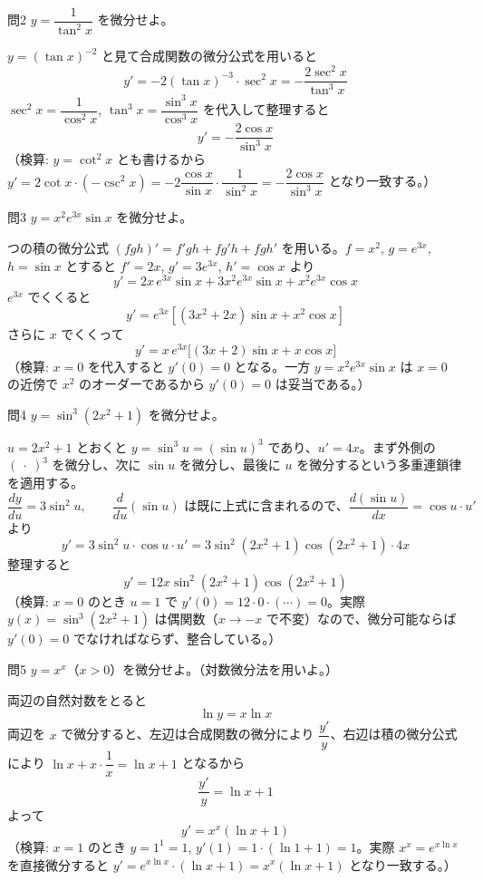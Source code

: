 \documentclass[a4paper,11pt]{article}
\begin{document}
\clearpage
\begin{mondaiboxS}{問2}
$y = \dfrac{1}{\tan^{2} x}$ を微分せよ。
\end{mondaiboxS}
\kaitou
$y = (\tan x)^{-2}$ と見て合成関数の微分公式を用いると
\[
y' = -2(\tan x)^{-3}\cdot \sec^{2}x
= -\frac{2\sec^{2}x}{\tan^{3}x}
\]
$\sec^{2}x = \dfrac{1}{\cos^{2}x}$, $\tan^{3}x = \dfrac{\sin^{3}x}{\cos^{3}x}$ を代入して整理すると
\[
\boxed{\; y' = -\dfrac{2\cos x}{\sin^{3} x} \;}
\]
（検算: $y=\cot^{2}x$ とも書けるから $y' = 2\cot x\cdot(-\csc^{2}x) = -2\dfrac{\cos x}{\sin x}\cdot\dfrac{1}{\sin^{2}x} = -\dfrac{2\cos x}{\sin^{3}x}$ となり一致する。）

\clearpage
\begin{mondaiboxS}{問3}
$y = x^{2}e^{3x}\sin x$ を微分せよ。
\end{mondaiboxS}
 つの積の微分公式 $(fgh)' = f'gh + fg'h + fgh'$ を用いる。$f=x^{2}$, $g=e^{3x}$, $h=\sin x$ とすると $f'=2x$, $g'=3e^{3x}$, $h'=\cos x$ より
\[
y' = 2x\,e^{3x}\sin x + 3x^{2}e^{3x}\sin x + x^{2}e^{3x}\cos x
\]
$e^{3x}$ でくくると
\[
y' = e^{3x}\left[(3x^{2}+2x)\sin x + x^{2}\cos x\right]
\]
さらに $x$ でくくって
\[
\boxed{\; y' = x\,e^{3x}\bigl[(3x+2)\sin x + x\cos x\bigr] \;}
\]
（検算: $x=0$ を代入すると $y'(0) = 0$ となる。一方 $y = x^{2}e^{3x}\sin x$ は $x=0$ の近傍で $x^{2}$ のオーダーであるから $y'(0)=0$ は妥当である。）

\clearpage
\begin{mondaiboxS}{問4}
$y = \sin^{3}\!\left(2x^{2}+1\right)$ を微分せよ。
\end{mondaiboxS}
\kaitou
$u = 2x^{2}+1$ とおくと $y = \sin^{3}u = (\sin u)^{3}$ であり、$u' = 4x$。まず外側の $(\ \cdot\ )^{3}$ を微分し、次に $\sin u$ を微分し、最後に $u$ を微分するという多重連鎖律を適用する。
\[
\frac{dy}{du} = 3\sin^{2}u, \qquad \frac{d}{du}(\sin u) \text{ は既に上式に含まれるので、} \frac{d(\sin u)}{dx} = \cos u\cdot u'
\]
より
\[
y' = 3\sin^{2}u\cdot\cos u\cdot u' = 3\sin^{2}(2x^{2}+1)\cos(2x^{2}+1)\cdot 4x
\]
整理すると
\[
\boxed{\; y' = 12x\sin^{2}\!\left(2x^{2}+1\right)\cos\!\left(2x^{2}+1\right) \;}
\]
（検算: $x=0$ のとき $u=1$ で $y'(0) = 12\cdot 0\cdot(\cdots) = 0$。実際 $y(x) = \sin^{3}(2x^{2}+1)$ は偶関数（$x\to -x$ で不変）なので、微分可能ならば $y'(0)=0$ でなければならず、整合している。）

\clearpage
\begin{mondaiboxS}{問5}
$y = x^{x}$（$x>0$）を微分せよ。（対数微分法を用いよ。）
\end{mondaiboxS}
\kaitou
両辺の自然対数をとると
\[
\ln y = x\ln x
\]
両辺を $x$ で微分すると、左辺は合成関数の微分により $\dfrac{y'}{y}$、右辺は積の微分公式により $\ln x + x\cdot\dfrac{1}{x} = \ln x + 1$ となるから
\[
\frac{y'}{y} = \ln x + 1
\]
よって
\[
\boxed{\; y' = x^{x}(\ln x + 1) \;}
\]
（検算: $x=1$ のとき $y=1^{1}=1$, $y'(1) = 1\cdot(\ln 1 + 1) = 1$。実際 $x^{x} = e^{x\ln x}$ を直接微分すると
$y' = e^{x\ln x}\cdot(\ln x + 1) = x^{x}(\ln x+1)$ となり一致する。）
\end{document}
